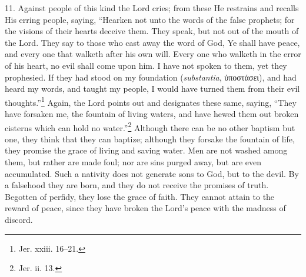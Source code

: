 11. Against people of this kind the Lord cries; from these He restrains and recalls His erring people, saying, “Hearken not unto the words of the false prophets; for the visions of their hearts deceive them. They speak, but not out of the mouth of the Lord. They say to those who cast away the word of God, Ye shall have peace, and every one that walketh after his own will. Every one who walketh in the error of his heart, no evil shall come upon him. I have not spoken to them, yet they prophesied. If they had stood on my foundation (\emph{substantia}, \textgreek{ὑποστάσει}), and had heard my words, and taught my people, I would have turned them from their evil thoughts.”\footnote{Jer. xxiii. 16–21.} Again, the Lord points out and designates these same, saying, “They have forsaken me, the fountain of living waters, and have hewed them out broken cisterns which can hold no water.”\footnote{Jer. ii. 13.} Although there can be no other baptism but one, they think that they can baptize; although they forsake the fountain of life, they promise the grace of living and saving water. Men are not washed among them, but rather are made foul; nor are sins purged away, but are even accumulated. Such a nativity does not generate sons to God, but to the devil. By a falsehood they are born, and they do not receive the promises of truth. Begotten of perfidy, they lose the grace of faith. They cannot attain to the reward of peace, since they have broken the Lord’s peace with the madness of discord.

